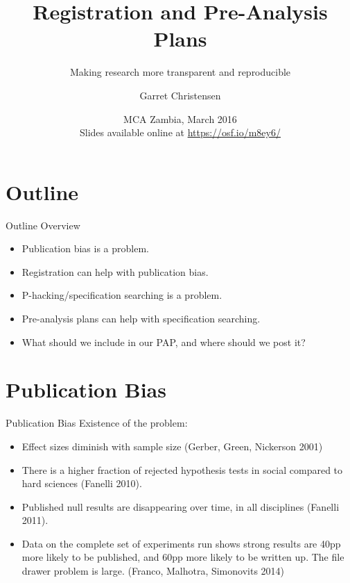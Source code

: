 \documentclass{beamer}
\title[Implementation: Registration and Pre-Analysis Plans] %
{Registration and Pre-Analysis Plans}
\subtitle
{Making research more transparent and reproducible}
\author[Garret Christensen] %
{Garret Christensen\inst{1}}
\institute[Universities of Somewhere and Elsewhere] %
{
  \inst{1}%
  UC Berkeley:\\
  Berkeley Initiative for Transparency in the Social Sciences\\
  Berkeley Institute for Data Science\\
  }
\date[BITSS2014] %
{MCA Zambia, March 2016\\
Slides available online at \url{https://osf.io/m8ey6/}}
\begin{document}
    
\begin{frame}
  \titlepage
\end{frame}



\section{Outline}

\begin{frame}[label=main]{Outline}
Overview
\begin{itemize}
\item
Publication bias is a problem.

\item
Registration can help with publication bias.
\item
P-hacking/specification searching is a problem.
\item
Pre-analysis plans can help with specification searching.
\item
What should we include in our PAP, and where should we post it?
\end{itemize}
\end{frame}
\section*{Publication Bias}
\begin{frame}{Publication Bias}%
  Existence of the problem:
  \begin{itemize}[<.->]
  \item
 Effect sizes diminish with sample size (Gerber, Green, Nickerson 2001)
  \item
  There is a higher fraction of rejected hypothesis tests in social compared to hard sciences (Fanelli 2010).
  \item
  	Published null results are disappearing over time, in all disciplines (Fanelli 2011). 
  \item
  	Data on the complete set of experiments run shows strong results are 40pp more likely to be published, and 60pp more likely to be written up. The file drawer problem is large. (Franco, Malhotra, Simonovits 2014)
  \end{itemize}
\end{frame}
\end{document}
